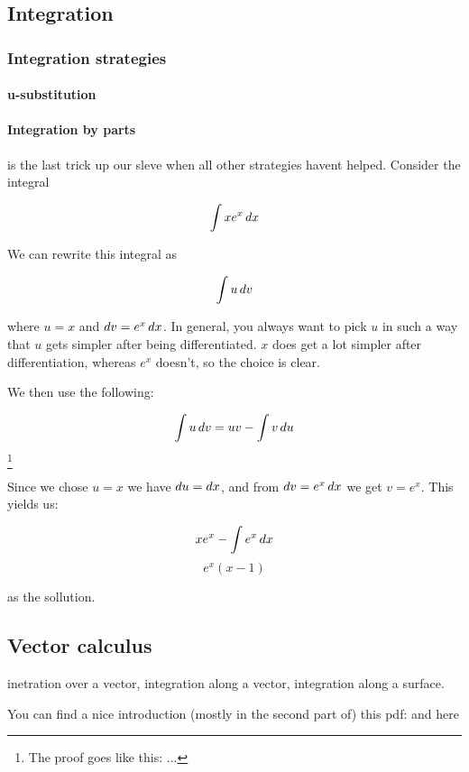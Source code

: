\subsection{Integration}

\subsubsection{Integration strategies}

\paragraph{u-substitution}

\paragraph{Integration by parts} is the last trick up our sleve when all other strategies havent helped. Consider the integral 

$$ \int x e^x \mathop{dx} $$

We can rewrite this integral as 

$$ \int u \mathop{dv} $$

where $u = x$ and $\mathop{dv} = e^x \mathop{dx}$. In general, you always want to pick $u$ in such a way that $u$ gets simpler after being differentiated. $x$ does get a lot simpler after differentiation, whereas $e^x$ doesn't, so the choice is clear. 

We then use the following: 

$$ \int u \mathop{dv} = uv - \int v \mathop{du} $$\footnote{The proof goes like this: ...}

Since we chose $u = x$ we have $\mathop{du} = \mathop{dx}$, and from $\mathop{dv} = e^x \mathop{dx}$ we get $v = e^x$. This yields us: 

$$ xe^x - \int e^x \mathop{dx} $$
$$ e^x ( x - 1) $$

as the sollution. 

\subsection{Vector calculus}

inetration over a vector, integration along a vector, integration along a surface. 

You can find a nice introduction (mostly in the second part of) this pdf:  and here 
